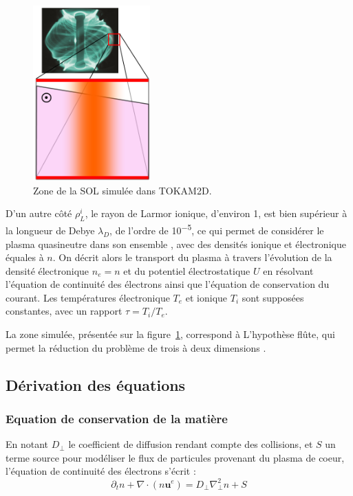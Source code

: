 \begin{refsection}
\begin{figure}
	\vspace{-5pt}

 \hspace{20pt}\includegraphics[width=0.40\textwidth]{figures/geomTokam.png}{\caption{Zone
de la SOL simulée dans TOKAM2D.}\label{figTokamGeom}}
	 \vspace{-20pt}
\end{figure}

D'un autre côté $\rho_L^i$, le rayon de Larmor ionique, d'environ
\unit{1}{\milli\meter}, est bien supérieur à la longueur de
Debye $\lambda_D$, de l'ordre de \unit{10^{-5}}{\meter}, ce qui permet de
considérer le plasma quasineutre dans son ensemble
, avec des densités ionique et électronique équales à $n$.
On décrit alors le transport du plasma à travers l'évolution de la densité
électronique $n_e=n$ et du potentiel électrostatique $U$ en résolvant l'équation
de continuité des électrons ainsi que l'équation de conservation du courant. Les
températures électronique
$T_e$ et ionique $T_i$ sont supposées constantes, avec un rapport $\tau=T_i/T_e$.

La zone simulée, présentée sur la figure~\ref{figTokamGeom}, correspond à  
L'hypothèse flûte, qui permet la réduction du problème de trois à deux
dimensions .
\subsection{Dérivation des équations}
\subsubsection{Equation de conservation de la matière}
En notant $D_\perp$ le coefficient de diffusion rendant compte des collisions,
et $S$ un terme source pour modéliser le flux de particules provenant du plasma
de coeur, l'équation de continuité des électrons s'écrit :
\begin{equation}
\label{2-ContinuiteElectrons}
\partial_t n + \nabla\cdot(n\mathbf{u}^e) = D_\perp\nabla^2_\perp n + S
\end{equation}


\end{refsection}
